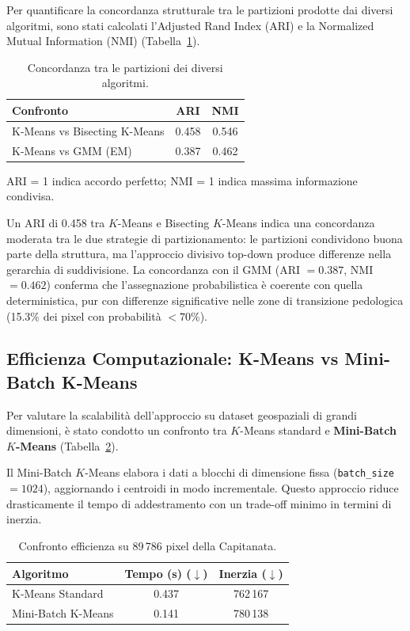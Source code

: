 \documentclass[a4paper,12pt]{article}
\newcommand{\kmeans}{$K$\nobreakdash-Means}
\begin{document}
Per quantificare la concordanza strutturale tra le partizioni prodotte
dai diversi algoritmi, sono stati calcolati l'Adjusted Rand Index (ARI)
e la Normalized Mutual Information (NMI)
(Tabella~\ref{tab:concordanza}).

\begin{table}[H]
    \centering
    \caption{Concordanza tra le partizioni dei diversi algoritmi.}
    \label{tab:concordanza}
    \begin{tabular}{@{}lcc@{}}
        \toprule
        \textbf{Confronto} & \textbf{ARI} & \textbf{NMI} \\
        \midrule
        K-Means vs Bisecting K-Means & 0.458 & 0.546\\
        K-Means vs GMM (EM)          & 0.387 & 0.462 \\
        \bottomrule
    \end{tabular}

    \vspace{4pt}
    {\footnotesize ARI = 1 indica accordo perfetto; NMI = 1 indica massima
    informazione condivisa.}
\end{table}

Un ARI di 0.458 tra \kmeans{} e Bisecting \kmeans{} indica una
concordanza moderata tra le due strategie di partizionamento: le
partizioni condividono buona parte della struttura, ma l'approccio
divisivo top-down produce differenze nella gerarchia di suddivisione.
La concordanza con il GMM (ARI $= 0.387$, NMI $= 0.462$) conferma
che l'assegnazione probabilistica è coerente con quella deterministica,
pur con differenze significative nelle zone di transizione pedologica
(15.3\% dei pixel con probabilità $< 70\%$).

\subsection{Efficienza Computazionale: K-Means vs Mini-Batch K-Means}

Per valutare la scalabilità dell'approccio su dataset geospaziali di
grandi dimensioni, è stato condotto un confronto tra \kmeans{} standard
e \textbf{Mini-Batch \kmeans{}} (Tabella~\ref{tab:efficienza}).

Il Mini-Batch \kmeans{} elabora i dati a blocchi di dimensione fissa
(\texttt{batch\_size} $= 1024$), aggiornando i centroidi in modo
incrementale. Questo approccio riduce drasticamente il tempo di
addestramento con un trade-off minimo in termini di inerzia.

\begin{table}[H]
    \centering
    \caption{Confronto efficienza su 89\,786 pixel della Capitanata.}
    \label{tab:efficienza}
    \begin{tabular}{@{}lcc@{}}
        \toprule
        \textbf{Algoritmo} & \textbf{Tempo (s)} ($\downarrow$) &
        \textbf{Inerzia} ($\downarrow$) \\
        \midrule
        K-Means Standard     & 0.437 & 762\,167 \\
        Mini-Batch K-Means   & 0.141 & 780\,138 \\
        \bottomrule
    \end{tabular}
\end{table}
\end{document}
